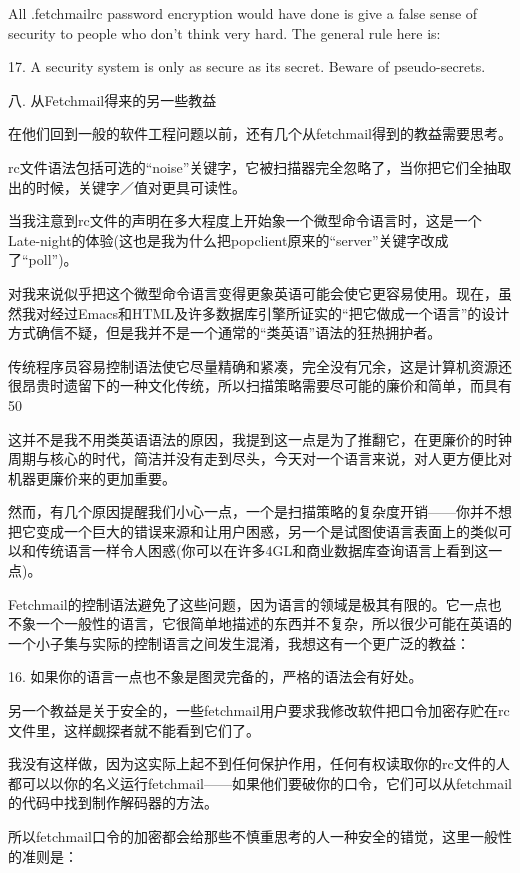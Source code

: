 \documentclass[a4paper,12pt,UTF8,twoside]{ctexbook}
\begin{document}
All .fetchmailrc password encryption would have done is give a false sense of security to people who don't think very hard. The general rule here is:

17. A security system is only as secure as its secret. Beware of pseudo-secrets.

八. 从Fetchmail得来的另一些教益


在他们回到一般的软件工程问题以前，还有几个从fetchmail得到的教益需要思考。


rc文件语法包括可选的“noise”关键字，它被扫描器完全忽略了，当你把它们全抽取出的时候，关键字／值对更具可读性。


当我注意到rc文件的声明在多大程度上开始象一个微型命令语言时，这是一个Late-night的体验(这也是我为什么把popclient原来的“server”关键字改成了“poll”)。


对我来说似乎把这个微型命令语言变得更象英语可能会使它更容易使用。现在，虽然我对经过Emacs和HTML及许多数据库引擎所证实的“把它做成一个语言”的设计方式确信不疑，但是我并不是一个通常的“类英语”语法的狂热拥护者。


传统程序员容易控制语法使它尽量精确和紧凑，完全没有冗余，这是计算机资源还很昂贵时遗留下的一种文化传统，所以扫描策略需要尽可能的廉价和简单，而具有50%


这并不是我不用类英语语法的原因，我提到这一点是为了推翻它，在更廉价的时钟周期与核心的时代，简洁并没有走到尽头，今天对一个语言来说，对人更方便比对机器更廉价来的更加重要。


然而，有几个原因提醒我们小心一点，一个是扫描策略的复杂度开销——你并不想把它变成一个巨大的错误来源和让用户困惑，另一个是试图使语言表面上的类似可以和传统语言一样令人困惑(你可以在许多4GL和商业数据库查询语言上看到这一点)。


Fetchmail的控制语法避免了这些问题，因为语言的领域是极其有限的。它一点也不象一个一般性的语言，它很简单地描述的东西并不复杂，所以很少可能在英语的一个小子集与实际的控制语言之间发生混淆，我想这有一个更广泛的教益：


16. 如果你的语言一点也不象是图灵完备的，严格的语法会有好处。


另一个教益是关于安全的，一些fetchmail用户要求我修改软件把口令加密存贮在rc文件里，这样觑探者就不能看到它们了。


我没有这样做，因为这实际上起不到任何保护作用，任何有权读取你的rc文件的人都可以以你的名义运行fetchmail——如果他们要破你的口令，它们可以从fetchmail的代码中找到制作解码器的方法。


所以fetchmail口令的加密都会给那些不慎重思考的人一种安全的错觉，这里一般性的准则是：
\end{document}
